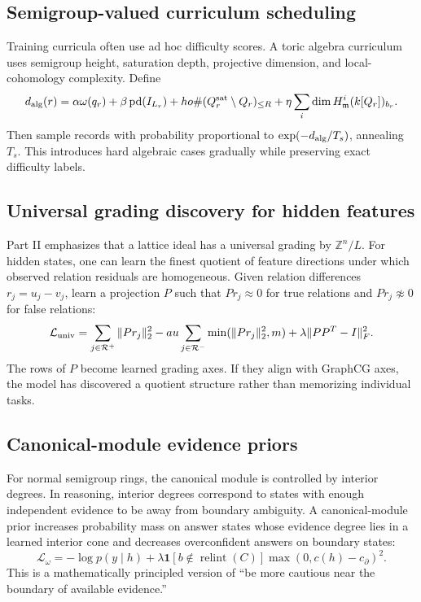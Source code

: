 \documentclass[11pt]{article}
\theoremstyle{definition}
\newcommand{\ZZ}{\mathbb{Z}}
\begin{document}
\subsection{Semigroup-valued curriculum scheduling}
Training curricula often use ad hoc difficulty scores.  A toric algebra curriculum uses semigroup height, saturation depth, projective dimension, and local-cohomology complexity.  Define
\[
  d_{\rm alg}(r)=\alpha\omega(q_r)+\beta\operatorname{pd}(I_{L_r})+
ho\#(Q_r^{\rm sat}\setminus Q_r)_{\le R}+\eta\sum_i\dim H^i_{\mathfrak m}(k[Q_r])_{b_r}.
\]
Then sample records with probability proportional to \(\exp(-d_{\rm alg}/T_s)\), annealing \(T_s\).  This introduces hard algebraic cases gradually while preserving exact difficulty labels.

\subsection{Universal grading discovery for hidden features}
Part II emphasizes that a lattice ideal has a universal grading by \(\ZZ^n/L\).  For hidden states, one can learn the finest quotient of feature directions under which observed relation residuals are homogeneous.  Given relation differences \(r_j=u_j-v_j\), learn a projection \(P\) such that \(Pr_j\approx0\) for true relations and \(Pr_j\not\approx0\) for false relations:
\[
\mathcal L_{\rm univ}=\sum_{j\in \mathcal R^+}\|Pr_j\|_2^2-	au\sum_{j\in\mathcal R^-}\min(\|Pr_j\|_2^2,m)+\lambda\|PP^T-I\|_F^2.
\]
The rows of \(P\) become learned grading axes.  If they align with GraphCG axes, the model has discovered a quotient structure rather than memorizing individual tasks.

\subsection{Canonical-module evidence priors}
For normal semigroup rings, the canonical module is controlled by interior degrees.  In reasoning, interior degrees correspond to states with enough independent evidence to be away from boundary ambiguity.  A canonical-module prior increases probability mass on answer states whose evidence degree lies in a learned interior cone and decreases overconfident answers on boundary states:
\[
\mathcal L_{\omega}= -\log p(y\mid h)+\lambda\mathbf 1[b\notin\operatorname{relint}(C)]\max(0,c(h)-c_{\partial})^2.
\]
This is a mathematically principled version of ``be more cautious near the boundary of available evidence.''
\end{document}

